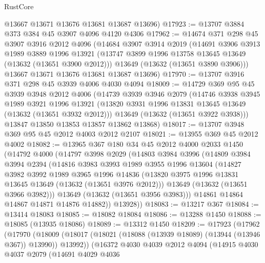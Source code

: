 \begin{lexlean}{RustCore}
\begin{coremodule}
      @13667
      @13671
      @13676
      @13681
      @13687
      @13696)
@17923 := @13707 @3884 @373 @384 @45 @3907 @4096 @4120 @4306
@17962 := @14674
    @371
    @298
    @45
    @3907
    @3916
    @2012
    @4096
    (@14684
      @3907
      @3914
      @2019
      (@14691
        @3906
        @3913
        @1989
        @3889
        @1996
        @13921
        (@13747 @3899 @1996 @13758 @13645 @13649 (@13632 (@13651 @3900 @2012)))
        @13649
        (@13632 (@13651 @3890 @3906)))
      @13667
      @13671
      @13676
      @13681
      @13687
      @13696)
@17970 := @13707 @3916 @371 @298 @45 @3939 @4006 @4030 @4094
@18009 := @14729
    @369
    @95
    @45
    @3939
    @3948
    @2012
    @4006
    (@14739
      @3939
      @3946
      @2079
      (@14746
        @3938
        @3945
        @1989
        @3921
        @1996
        @13921
        (@13820 @3931 @1996 @13831 @13645 @13649 (@13632 (@13651 @3932 @2012)))
        @13649
        (@13632 (@13651 @3922 @3938)))
      @13847
      @13850
      @13853
      @13857
      @13862
      @13868)
@18017 := @13707 @3948 @369 @95 @45 @2012 @4003 @2012 @2107
@18021 := @13955 @369 @45 @2012 @4002
@18082 := @13965
    @367
    @180
    @34
    @45
    @2012
    @4000
    @2033
    @1450
    (@14792
      @4000
      (@14797
        @3998
        @2029
        (@14803
          @3984
          @3996
          (@14809
            @3984
            @3994
            @2394
            (@14816
              @3983
              @3993
              @1989
              @3955
              @1996
              @13604
              (@14827
                @3982
                @3992
                @1989
                @3965
                @1996
                @14836
                (@13820 @3975 @1996 @13831 @13645 @13649 (@13632 (@13651 @3976 @2012)))
                @13649
                (@13632 (@13651 @3966 @3982)))
              @13649
              (@13632 (@13651 @3956 @3983)))
            @14861
            @14864
            @14867
            @14871
            @14876
            @14882))
        @13928))
@18083 := @13217 @367
@18084 := @13414 @18083
@18085 := @18082 @18084
@18086 := @13288 @1450
@18088 := @18085 (@13935 @18086)
@18089 := @13312 @1450
@18209 := @17923
    (@17962
      (@17970
        (@18009 (@18017 (@18021 (@18088 (@13939 @18089) (@13944 (@13946 @367)) @13990)) @13992))
        (@16372
          @4030
          @4039
          @2012
          @4094
          (@14915
            @4030
            @4037
            @2079
            (@14691
              @4029
              @4036

\end{coremodule}
\end{lexlean}
